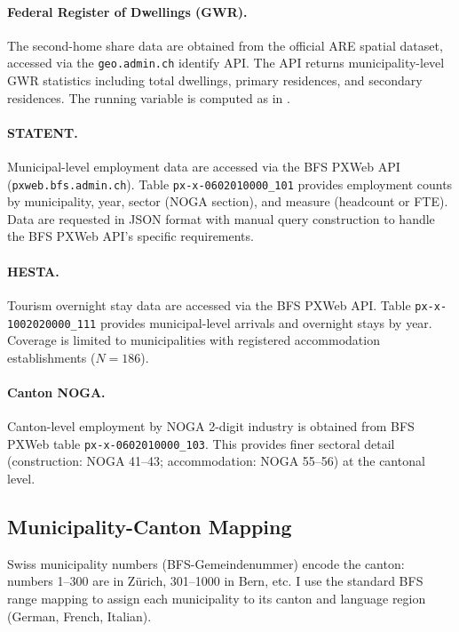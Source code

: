 \documentclass[12pt]{article}
\begin{document}
\paragraph{Federal Register of Dwellings (GWR).} The second-home share data are obtained from the official ARE spatial dataset, accessed via the \texttt{geo.admin.ch} identify API. The API returns municipality-level GWR statistics including total dwellings, primary residences, and secondary residences. The running variable is computed as in .

\paragraph{STATENT.} Municipal-level employment data are accessed via the BFS PXWeb API (\texttt{pxweb.bfs.admin.ch}). Table \texttt{px-x-0602010000\_101} provides employment counts by municipality, year, sector (NOGA section), and measure (headcount or FTE). Data are requested in JSON format with manual query construction to handle the BFS PXWeb API's specific requirements.

\paragraph{HESTA.} Tourism overnight stay data are accessed via the BFS PXWeb API. Table \texttt{px-x-1002020000\_111} provides municipal-level arrivals and overnight stays by year. Coverage is limited to municipalities with registered accommodation establishments ($N = 186$).

\paragraph{Canton NOGA.} Canton-level employment by NOGA 2-digit industry is obtained from BFS PXWeb table \texttt{px-x-0602010000\_103}. This provides finer sectoral detail (construction: NOGA 41--43; accommodation: NOGA 55--56) at the cantonal level.

\subsection{Municipality-Canton Mapping}

Swiss municipality numbers (BFS-Gemeindenummer) encode the canton: numbers 1--300 are in Z\"urich, 301--1000 in Bern, etc. I use the standard BFS range mapping to assign each municipality to its canton and language region (German, French, Italian).
\end{document}
